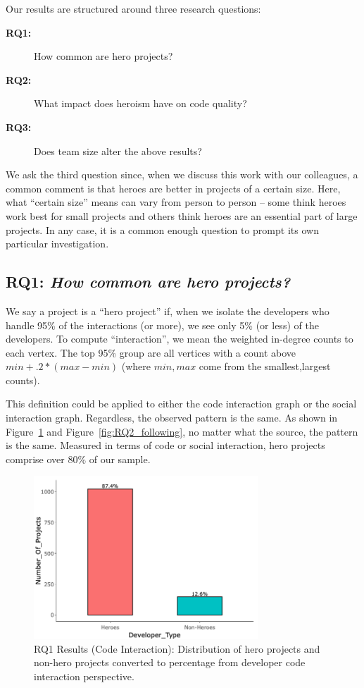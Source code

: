 \documentclass[sigconf,review]{acmart}
\newcommand{\fig}[1]{Figure~\ref{fig:#1}}
\begin{document}
Our results are structured around three research questions:

\begin{description}
    \item[{\bf RQ1:}] How common are hero projects?
    \item[{\bf RQ2:}] What    impact  does heroism  have  on  code quality?
    \item[{\bf RQ3:}] Does team size alter the above results?
\end{description}
We ask the third question since, when we discuss this work with our colleagues,
a common comment is that heroes are better in projects of a certain size.  
Here, what ``certain size'' means can vary from person to person -- some think heroes work best for small projects and others think heroes are an essential part of
large projects. In any case, it is a common enough question to prompt its own particular investigation.


\subsection{\textbf{RQ1:} \textit{How common are hero projects?}}
\label{sec:RQ1}

We say a project is a ``hero project'' if, when we isolate the developers who handle  95\% of the interactions (or more),
we see only 5\% (or less) of the developers. To compute ``interaction'', we mean   the  weighted in-degree counts to each vertex. The top 95\% group are all vertices with a count above $\mathit{min}+.2*(\mathit{max}-\mathit{min})$ 
(where $\mathit{min,max}$ come from the smallest,largest counts).

This definition could be applied to either the code interaction graph or the social interaction graph. Regardless,
the observed pattern is the same. As shown in
\fig{RQ1_following} and \fig{RQ2_following}, no matter what the source, the pattern is the same. Measured
in terms of code or social interaction, hero projects comprise over 80\% of our sample.

 

\begin{figure}
\includegraphics[width=\linewidth, height =6.1cm]{RQ1_Code.png}
\caption{RQ1 Results (Code Interaction): Distribution of hero projects and non-hero projects converted to percentage from developer code interaction perspective.}
\label{fig:RQ1_following}
\end{figure}
\end{document}
